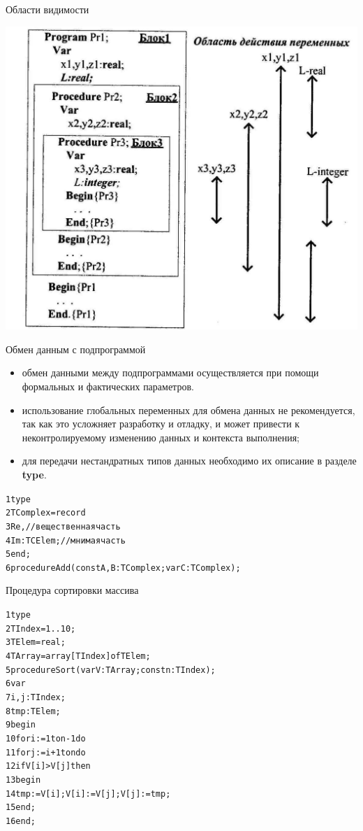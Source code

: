 \documentclass{beamer}
\begin{document}
\begin{frame}
\begin{block}{Области видимости}
\begin{center}
\includegraphics[scale=0.8]{images/block.jpg}
\end{center}
\end{block}
\end{frame}

\begin{frame}[fragile]{Обмен данным с подпрограммой}
\begin{itemize}
\item обмен данными между подпрограммами осуществляется при помощи формальных и фактических параметров.
\item использование глобальных переменных для обмена данных не рекомендуется, так как это усложняет разработку и отладку, и может привести к неконтролируемому изменению данных и контекста выполнения;
\item для передачи нестандратных типов данных необходимо их описание в разделе \textbf{type}.
\end{itemize}
\begin{alltt}
1 type
2   TComplex = record
3     Re, //вещественная часть
4     Im: TСElem; //мнимая часть
5   end;
6 procedure Add(const A, B: TComplex; var C: TComplex); 
\end{alltt}
\end{frame}

\begin{frame}[fragile]{Процедура сортировки массива}
\begin{alltt}
1 type
2   TIndex = 1..10;
3   TElem = real;
4   TArray = array[TIndex] of TElem;
5 procedure Sort(var V:TArray; const n:TIndex); 
6 var
7   i, j: TIndex;
8   tmp:  TElem;
9 begin
10  for i := 1 to n-1 do
11    for j := i + 1 to n do
12      if V[i] > V[j] then
13      begin
14        tmp := V[i]; V[i] := V[j]; V[j] := tmp;
15      end;
16 end;
\end{alltt}
\end{frame}
\end{document}
